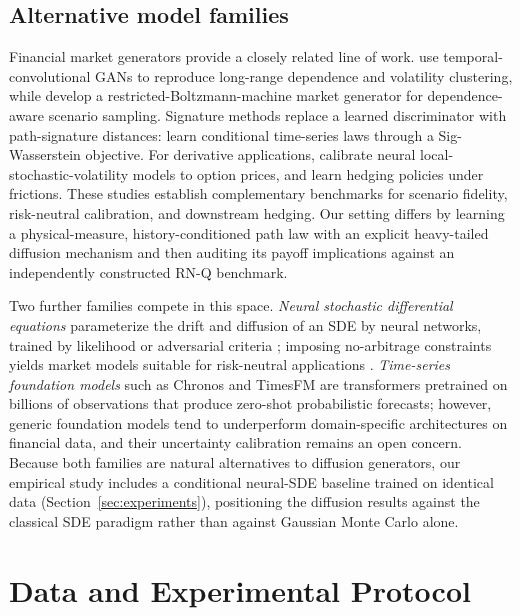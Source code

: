﻿\documentclass[12pt,letterpaper]{article}
\begin{document}
\subsection{Alternative model families}

Financial market generators provide a closely related line of work.
\citet{wiese2020quantgans} use temporal-convolutional GANs to reproduce
long-range dependence and volatility clustering, while
\citet{kondratyev2019market} develop a restricted-Boltzmann-machine market
generator for dependence-aware scenario sampling. Signature methods replace a
learned discriminator with path-signature distances:
\citet{liao2024sigwasserstein} learn conditional time-series laws through a
Sig-Wasserstein objective. For derivative applications,
\citet{cuchiero2020ganlsv} calibrate neural local-stochastic-volatility models
to option prices, and \citet{buehler2019deephedging} learn hedging policies
under frictions. These studies establish complementary benchmarks for
scenario fidelity, risk-neutral calibration, and downstream hedging. Our
setting differs by learning a physical-measure, history-conditioned path law
with an explicit heavy-tailed diffusion mechanism and then auditing its
payoff implications against an independently constructed RN-Q benchmark.

Two further families compete in this space. \emph{Neural stochastic
differential equations} parameterize the drift and diffusion of an SDE by
neural networks, trained by likelihood or adversarial criteria
\citep{gierjatowicz2020neural}; imposing no-arbitrage constraints yields
market models suitable for risk-neutral applications
\citep{cohen2023neuralsde}. \emph{Time-series foundation models} such as
Chronos \citep{ansari2024chronos} and TimesFM \citep{das2024timesfm} are
transformers pretrained on billions of observations that produce zero-shot
probabilistic forecasts; however, generic foundation models tend to
underperform domain-specific architectures on financial data, and their
uncertainty calibration remains an open concern. Because both families are
natural alternatives to diffusion generators, our empirical study includes a
conditional neural-SDE baseline trained on identical data
(Section~\ref{sec:experiments}), positioning the diffusion results against the
classical SDE paradigm rather than against Gaussian Monte Carlo alone.

\section{Data and Experimental Protocol}\label{sec:data}
\end{document}
